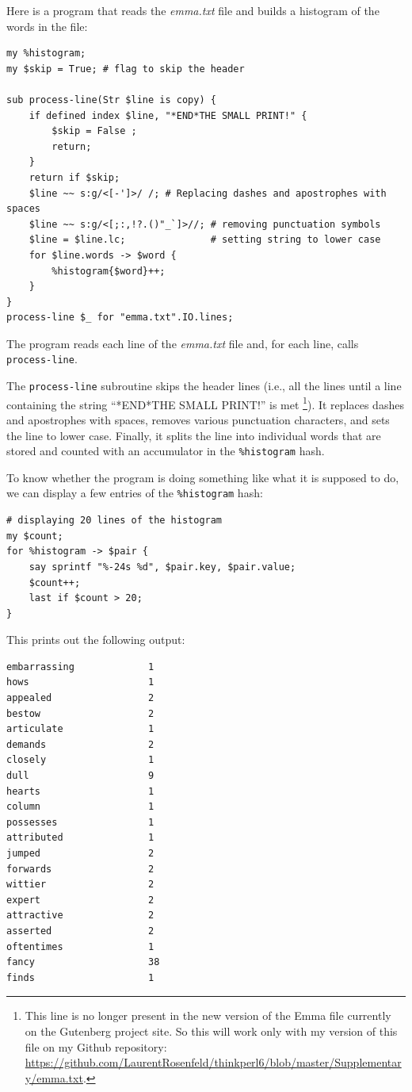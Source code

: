 Here is a program that reads the \emph{emma.txt} file and 
builds a histogram of the words in the file:

\begin{verbatim}
my %histogram;
my $skip = True; # flag to skip the header

sub process-line(Str $line is copy) {
    if defined index $line, "*END*THE SMALL PRINT!" {
        $skip = False ;
        return;
    }
    return if $skip;
    $line ~~ s:g/<[-']>/ /; # Replacing dashes and apostrophes with spaces
    $line ~~ s:g/<[;:,!?.()"_`]>//; # removing punctuation symbols
    $line = $line.lc;               # setting string to lower case
    for $line.words -> $word {
        %histogram{$word}++;
    }
}
process-line $_ for "emma.txt".IO.lines; 
\end{verbatim}
%

The program reads each line of the \emph{emma.txt} file and, for 
each line, calls \verb"process-line". 

The \verb"process-line" subroutine skips the header lines 
(i.e., all the lines until a line containing the string
``*END*THE SMALL PRINT!'' 
is met \footnote{This line is no longer present in the new version of 
the Emma file currently on the Gutenberg project site. So this will 
work only with my version of this file on my Github repository:  
\url{https://github.com/LaurentRosenfeld/thinkperl6/blob/master/Supplementary/emma.txt}.}). It replaces dashes and apostrophes with spaces, removes 
various punctuation characters, and sets the line to lower case. 
Finally, it splits the line into individual words that are 
stored and counted with an accumulator in the \verb'%histogram' 
hash.

To know whether the program is doing something like what 
it is supposed to do, we can display a few entries of the 
\verb'%histogram' hash:

\begin{verbatim}
# displaying 20 lines of the histogram
my $count;
for %histogram -> $pair {
    say sprintf "%-24s %d", $pair.key, $pair.value;
    $count++;
    last if $count > 20;
}
\end{verbatim}

This prints out the following output:

\begin{verbatim}
embarrassing             1
hows                     1
appealed                 2
bestow                   2
articulate               1
demands                  2
closely                  1
dull                     9
hearts                   1
column                   1
possesses                1
attributed               1
jumped                   2
forwards                 2
wittier                  2
expert                   2
attractive               2
asserted                 2
oftentimes               1
fancy                    38
finds                    1
\end{verbatim}



